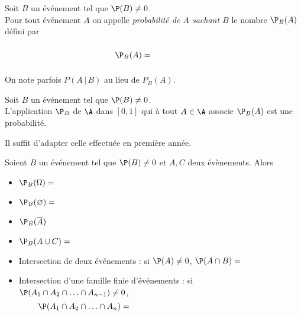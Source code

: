 \documentclass[a4paper,10pt]{report}
\begin{document}
\begin{defin}
Soit $B$ un événement tel que $\P(B) \neq 0$.\\
Pour tout événement $A$ on appelle \textit{probabilité de $A$ sachant $B$} le nombre $\P_B(A)$ défini par 

$$ \P_B(A) = \phantom{\frac{\P(A\cap B)}{\P(B)}}$$

\end{defin}

\begin{rem} On note parfois $P(A \, \vert \, B)$ au lieu de $P_B(A)$.
\end{rem}


\begin{prop}
Soit $B$ un événement tel que $\P(B) \neq 0$.\\
L'application $\P_B$ de $\A$ dans $[0,1]$ qui à tout $A \in \A$ associe $\P_B(A)$ est une probabilité.
\end{prop}

\begin{preuve}
Il suffit d'adapter celle effectuée en première année.
\end{preuve}
\begin{cor}
Soient $B$ un événement tel que $\P(B) \ne 0$ et $A,C$ deux évènements. Alors 
 \begin{itemize}
  \item $\P_B(\Omega) = $
  \item $\P_B(\varnothing) = $
  \item $\P_B(\overline{A})$
  \item $\P_B(A\cup C) = $
 \end{itemize}
\end{cor}
%


\begin{thm}
 \begin{itemize}
  \item Intersection de deux événements : si $\P(A) \ne 0$, $\P(A\cap B) = $
  \item Intersection d'une famille finie d'événements : si $\P(A_1 \cap A_2 \cap \ldots \cap A_{n-1}) \neq 0$,
   $$\P(A_1 \cap A_2 \cap \ldots \cap A_n)= \qquad \qquad \qquad \phantom{ahahaaaaaaaaaaaa bla bla bla}$$
 \end{itemize}
\end{thm}
\end{document}
